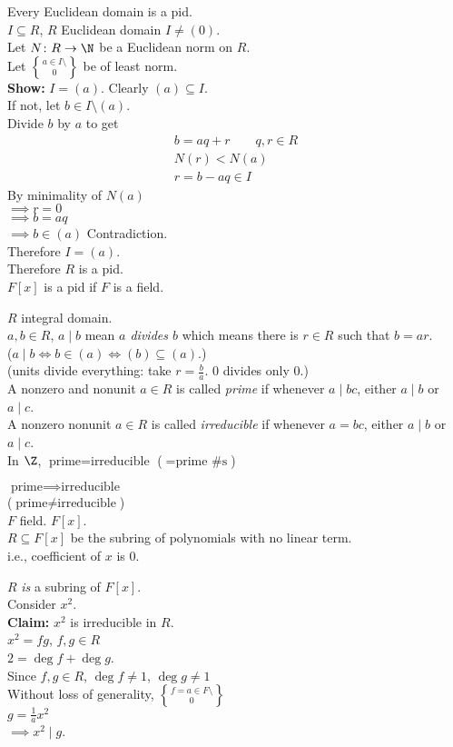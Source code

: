\thm Every Euclidean domain is a pid. \\
\pf $I\subseteq R$, $R$ Euclidean domain $I\neq(0)$. \\
Let $N\colon R\to\N$ be a Euclidean norm on $R$. \\
Let $a\in I\setminus\brace0$ be of least norm. \\
\textbf{Show:} $I=(a)$.  Clearly $(a)\subseteq I$. \\
If not, let $b\in I\setminus(a)$. \\
Divide $b$ by $a$ to get
\begin{gather*}
b = aq + r \qquad q,r\in R \\
N(r) < N(a) \\
r = b - aq \in I
\end{gather*}
By minimality of $N(a)$ \\
$\implies r=0$ \\
$\implies b=aq$ \\
$\implies b\in(a)$ Contradiction. \\
Therefore $I=(a)$. \\
Therefore $R$ is a pid. \\
\cor $F[x]$ is a pid if $F$ is a field.

 $R$ integral domain. \\
$a,b\in R$, $a\mid b$ mean \emph{$a$ divides $b$} which means there is $r\in R$ such that $b=ar$. \\
(\note $a\mid b \iff b\in(a)\iff(b)\subseteq(a)$.) \\
(\note units divide everything: take $r=\frac ba$.  $0$ divides only $0$.) \\
A nonzero and nonunit $a\in R$ is called \emph{prime} if whenever $a\mid bc$, either $a\mid b$ or $a\mid c$. \\
A nonzero nonunit $a\in R$ is called \emph{irreducible} if whenever $a=bc$, either $a\mid b$ or $a\mid c$. \\
\ex In $\Z$, $\text{prime}=\text{irreducible}$ ($=\text{prime \#s}$)

\note $\text{prime}\implies\text{irreducible}$ \\
\ex ($\text{prime}\neq\text{irreducible}$) \\
$F$ field. $F[x]$. \\
$R\subseteq F[x]$ be the subring of polynomials with no linear term. \\
i.e., coefficient of $x$ is $0$.

\ex $R$ \emph{is} a subring of $F[x]$. \\
Consider $x^2$. \\
\textbf{Claim: } $x^2$ is irreducible in $R$. \\
\pf $x^2=fg$, $f,g\in R$ \\
$2=\deg f+\deg g$. \\
Since $f,g\in R$, $\deg f\neq1$, $\deg g\neq1$ \\
Without loss of generality, $f=a\in F\setminus\brace0$ \\
$g=\frac1ax^2$ \\
$\implies x^2\mid g$.

